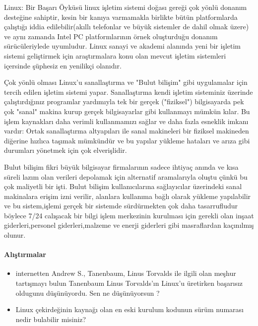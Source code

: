\documentclass[10pt,a5paper]{book}
\begin{document}
\begin{section}{Linux: Bir Başarı Öyküsü}
linux işletim sistemi doğası gereği çok yönlü donanım desteğine sahiptir, kesin bir kanıya varmamakla birlikte bütün platformlarda çalıştığı iddia edilebilir(akıllı telefonlar ve büyük sistemler de dahil olmak üzere) ve aynı zamanda Intel PC platformlarının örnek oluşturduğu donanım sürücüleriylede uyumludur. Linux sanayi ve akademi alanında  yeni bir işletim sistemi geliştirmek için araştırmalara konu olan  mevcut işletim sistemleri içersinde şüphesiz en yenilikçi olanıdır.

Çok yönlü olması Linux'u sanallaştırma ve "Bulut bilişim" gibi uygulamalar için tercih edilen işletim sistemi yapar. Sanallaştırma kendi işletim sisteminiz üzerinde çalıştırdığınız programlar yardımıyla tek bir gerçek ("fiziksel") bilgisayarda  pek çok "sanal" makina kurup  gerçek bilgisayarlar gibi kullanmayı mümkün kılar. Bu işlem kaynakları daha verimli kullanmamızı sağlar ve daha fazla esneklik imkanı vardır: Ortak sanallaştırma altyapıları ile sanal makineleri bir fiziksel makineden diğerine hızlıca taşımak mümkündür ve bu yapılar yükleme hataları ve arıza gibi durumları yönetmek için çok elverişlidir.

Bulut bilişim fikri büyük bilgisayar firmalarının sadece ihtiyaç anında ve kısa süreli lazım olan verileri depolamak için alternatif aramalarıyla oluştu çünkü bu çok maliyetli bir işti. Bulut bilişim kullanıcılarına sağlayıcılar üzerindeki sanal makinalara erişim izni verilir, alanlara kullanıma bağlı olarak yükleme yapılabilir ve bu sistem,işlemi gerçek bir sistemde sürdürmekten çok daha tasarrufludur böylece 7/24 calışacak bir bilgi işlem merkezinin kurulması için gerekli olan inşaat giderleri,personel giderleri,malzeme ve enerji giderleri gibi masraflardan kaçınılmış olunur.
\paragraph{Alıştırmalar}{
\begin{itemize}
 \item internetten Andrew S., Tanenbaum, Linus Torvalds ile ilgili olan meşhur tartışmayı bulun Tanenbaum Linus Torvalds'ın Linux'u üretirken başarısız oldugunu düşünüyordu. Sen ne düşünüyorsun ?
 \item Linux çekirdeğinin kaynağı olan en eski kurulum kodunun sürüm numarası nedir bulabilir misiniz?
\end{itemize}}
\end{section}
\end{document}

